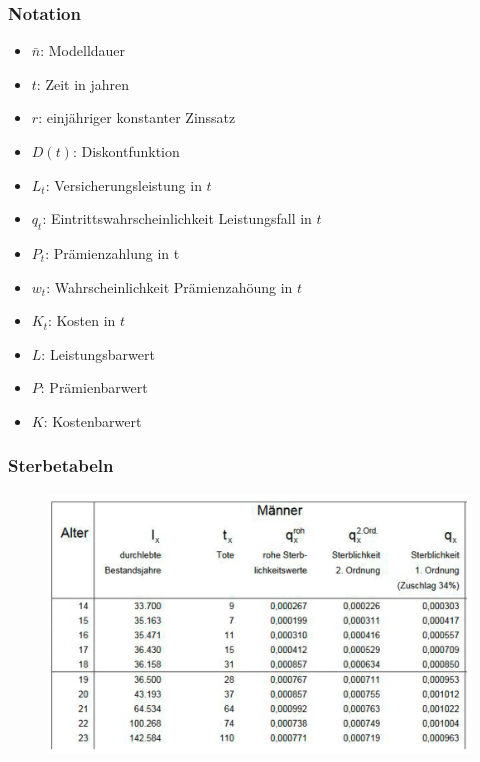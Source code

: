 \documentclass[12pt]{report}
\theoremstyle{dotless}
\theoremstyle{definition}
\begin{document}
\subsubsection{Notation}
\begin{itemize}
	\item $\bar{n}$: Modelldauer
	\item $t$: Zeit in jahren
	\item $r$: einjähriger konstanter Zinssatz
	\item $D(t)$: Diskontfunktion
	\item $L_t$: Versicherungsleistung in $t$
	\item $q_t$: Eintrittswahrscheinlichkeit Leistungsfall in $t$
	\item $P_t$: Prämienzahlung in t
	\item $w_t$: Wahrscheinlichkeit Prämienzahöung in $t$
	\item $K_t$: Kosten in $t$
	\item $L$: Leistungsbarwert
	\item $P$: Prämienbarwert
	\item $K$: Kostenbarwert
\end{itemize}

\subsubsection{Sterbetabeln}

\begin{figure}[ht]
	\centering
	\includegraphics[width = .8\textwidth]{Bilder/Sterbetafelbsp.png}
\end{figure}
\end{document}

